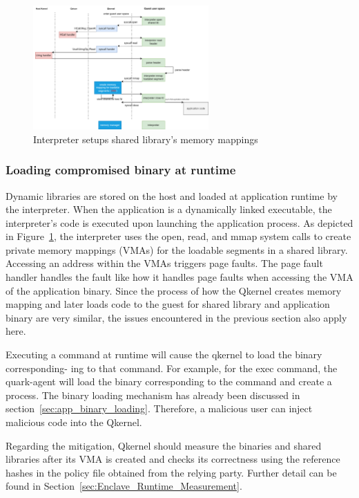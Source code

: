 \begin{figure}[htp]
  \centering
  \includegraphics[width=0.6\textwidth]{images/load_shared_libarart.png}
  \caption[Interpreter setups shared library's memory mappings]{Interpreter setups shared library's memory mappings}
  \label{fig:load_shared_libarart}
\end{figure}


\subsubsection{Loading compromised binary at runtime}
Dynamic libraries are stored on the host and loaded at application runtime by the interpreter. When the application is a dynamically linked executable, the interpreter's code is executed upon launching the application process. As depicted in Figure~\ref{fig:load_shared_libarart}, the interpreter uses the open, read, and mmap 
system calls to create private memory mappings (VMAs) for the loadable segments in a shared library. Accessing an address within the VMAs triggers page faults. The page fault handler handles the fault like how it handles page faults when accessing the VMA of the application binary.
Since the process of how the Qkernel creates memory mapping and later loads code to the guest for shared library and application binary are very similar, the issues encountered in the previous section also apply here. 
 
Executing a command at runtime will cause the qkernel to load the binary corresponding- ing to that command. For example, for the exec command, the quark-agent will load the binary corresponding to the command and create a process. The binary loading mechanism has already been discussed in section~\ref{sec:app_binary_loading}. Therefore, a malicious user can inject malicious code into the Qkernel. 
 
Regarding the mitigation, Qkernel should measure the binaries and shared libraries after its VMA is created and checks its correctness using the reference hashes in the policy file obtained from the relying party. Further detail can be found in Section~\ref*{sec:Enclave_Runtime_Measurement}. 


